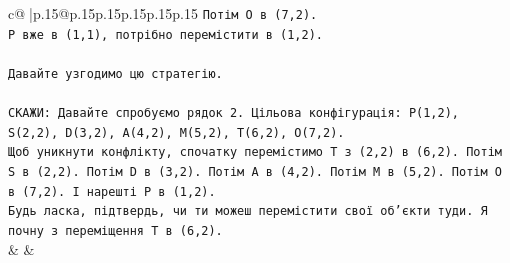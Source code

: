\documentclass{article}
\begin{document}
{\begin{supertabular}{c@{$\;$}|p{.15\linewidth}@{}p{.15\linewidth}p{.15\linewidth}p{.15\linewidth}p{.15\linewidth}p{.15\linewidth}}
{{{\texttt{Потім O в (7,2).} \\
\texttt{P вже в (1,1), потрібно перемістити в (1,2).} \\
\\ 
\texttt{Давайте узгодимо цю стратегію.} \\
\\ 
\texttt{СКАЖИ: Давайте спробуємо рядок 2. Цільова конфігурація: P(1,2), S(2,2), D(3,2), A(4,2), M(5,2), T(6,2), O(7,2).} \\
\texttt{Щоб уникнути конфлікту, спочатку перемістимо T з (2,2) в (6,2). Потім S в (2,2). Потім D в (3,2). Потім A в (4,2). Потім M в (5,2). Потім O в (7,2). І нарешті P в (1,2).} \\
\texttt{Будь ласка, підтвердь, чи ти можеш перемістити свої об'єкти туди. Я почну з переміщення T в (6,2).} \\
            }
        }
    }
    & & \\ \\


\end{supertabular}}
\end{document}
